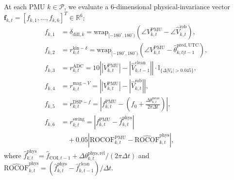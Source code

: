 \documentclass[journal,twoside]{IEEEtran}
\begin{document}
At each PMU $k \in \mathcal{P}$, we evaluate a 6-dimensional physical-invariance vector $\mathbf{f}_{k,t} = [f_{k,1}, \dots, f_{k,6}]^T \in \mathbb{R}^6$:
\begin{align}
f_{k,1} &= \delta_{\mathrm{diff},k} = \mathrm{wrap}_{[-180^\circ,180^\circ)}\left(\angle V_{k,t}^{\mathrm{PMU}} - \angle\hat{V}_{k,t}^{\mathrm{rob}}\right), \label{eq:f1} \\
f_{k,2} &= r_{k,t}^{\mathrm{kin}-\delta} = \mathrm{wrap}_{[-180^\circ,180^\circ)}\left(\angle V_{k,t}^{\mathrm{PMU}} - \hat{\theta}_{k,t|t-1}^{\mathrm{pred,UTC}}\right), \label{eq:f2} \\
f_{k,3} &= r_{k,t}^{\mathrm{ADC}} = 10\left||V_{k,t}^{\mathrm{PMU}}| - |\hat{V}_{k,t-1}^{\mathrm{clean}}|\right| \cdot \mathbb{I}_{\{\Delta|V_k| > 0.045\}}, \label{eq:f3} \\
f_{k,4} &= r_{k,t}^{\mathrm{mag}-V} = \left||V_{k,t}^{\mathrm{PMU}}| - |\hat{V}_{k,t}^{\mathrm{rob}}|\right|, \label{eq:f4} \\
f_{k,5} &= r_{k,t}^{\mathrm{DSP}-f} = \left|f_{k,t}^{\mathrm{PMU}} - \left(f_0 + \frac{\Delta\theta_{k,t}^{\mathrm{meas}}}{2\pi\Delta t}\right)\right|, \label{eq:f5} \\
f_{k,6} &= r_{k,t}^{\mathrm{swing}} = \left|f_{k,t}^{\mathrm{PMU}} - \hat{f}_{k,t}^{\mathrm{phys}}\right| \nonumber \\
&\quad + 0.05\left|\mathrm{ROCOF}_{k,t}^{\mathrm{PMU}} - \widehat{\mathrm{ROCOF}}_{k,t}^{\mathrm{phys}}\right|, \label{eq:f6}
\end{align}
where $\hat{f}_{k,t}^{\mathrm{phys}} = \hat{f}_{\mathrm{COI},t-1} + \Delta\theta_{k,t}^{\mathrm{phys,rel}}/(2\pi\Delta t)$ and $\widehat{\mathrm{ROCOF}}_{k,t}^{\mathrm{phys}} = (\hat{f}_{k,t}^{\mathrm{phys}} - \hat{f}_{k,t-1}^{\mathrm{clean}})/\Delta t$.
\end{document}
